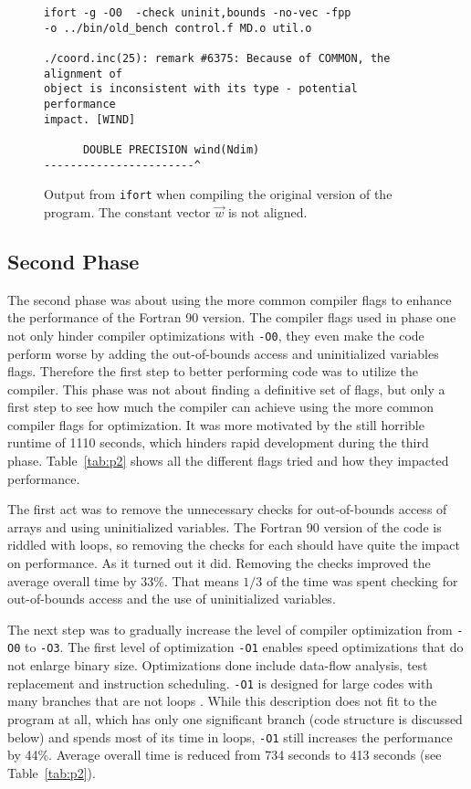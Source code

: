 \documentclass[twoside,11pt]{article}
\begin{document}
\begin{figure}
\begin{verbatim}
ifort -g -O0  -check uninit,bounds -no-vec -fpp
-o ../bin/old_bench control.f MD.o util.o

./coord.inc(25): remark #6375: Because of COMMON, the alignment of
object is inconsistent with its type - potential performance
impact. [WIND]

      DOUBLE PRECISION wind(Ndim)
-----------------------^
\end{verbatim}
\caption{Output from \texttt{ifort} when compiling the original
  version of the program. The constant vector $\vec{w}$ is not
  aligned.}
\label{fig:common_unaligned}
\end{figure}


\subsection{Second Phase} %

The second phase was about using the more common compiler flags to
enhance the performance of the Fortran 90 version.
The compiler flags used in phase one not only hinder compiler
optimizations with \texttt{-O0}, they even make the code perform worse
by adding the out-of-bounds access and uninitialized variables flags.
Therefore the first step to better performing code was to utilize the
compiler.
This phase was not about finding a definitive set of flags, but only
a first step to see how much the compiler can achieve using the
more common compiler flags for optimization.
It was more motivated by the still horrible runtime of 1110 seconds,
which hinders rapid development during the third phase.
Table~\ref{tab:p2} shows all the different flags tried and how they
impacted performance.

The first act was to remove the unnecessary checks for out-of-bounds
access of arrays and using uninitialized variables.
The Fortran 90 version of the code is riddled with loops, so removing
the checks for each should have quite the impact on performance.
As it turned out it did.
Removing the checks improved the average overall time by $33\%$.
That means $1/3$ of the time was spent checking for out-of-bounds
access and the use of uninitialized variables.

The next step was to gradually increase the level of compiler
optimization from \texttt{-O0} to \texttt{-O3}.
The first level of optimization \texttt{-O1} enables speed
optimizations that do not enlarge binary size.
Optimizations done include data-flow analysis, test replacement and
instruction scheduling.
\texttt{-O1} is designed for large codes with many branches that
are not loops \citep{o}.
While this description does not fit to the program at all, which
has only one significant branch (code structure is discussed below)
and spends most of its time in loops, \texttt{-O1} still increases
the performance by 44\%.
Average overall time is reduced from 734 seconds to 413 seconds
(see Table~\ref{tab:p2}).
\end{document}
